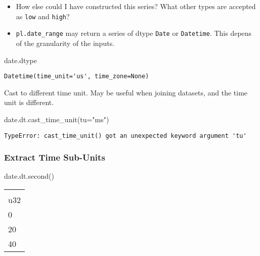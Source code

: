 \documentclass[
  letterpaper,
  DIV=11,
  numbers=noendperiod]{scrartcl}
\newenvironment{Shaded}{\begin{snugshade}}{\end{snugshade}}
\newcommand{\NormalTok}[1]{\textcolor[rgb]{0.00,0.23,0.31}{#1}}
\newcommand{\OperatorTok}[1]{\textcolor[rgb]{0.37,0.37,0.37}{#1}}
\newcommand{\StringTok}[1]{\textcolor[rgb]{0.13,0.47,0.30}{#1}}
\providecommand{\tightlist}{%
  \setlength{\itemsep}{0pt}\setlength{\parskip}{0pt}}\usepackage{longtable,booktabs,array}
\begin{document}
\begin{itemize}
\tightlist
\item
  How else could I have constructed this series? What other types are
  accepted as \texttt{low} and \texttt{high}?
\item
  \texttt{pl.date\_range} may return a series of dtype \texttt{Date} or
  \texttt{Datetime}. This depens of the granularity of the inputs.
\end{itemize}

\begin{Shaded}
\begin{Highlighting}[]
\NormalTok{date.dtype}
\end{Highlighting}
\end{Shaded}

\begin{verbatim}
Datetime(time_unit='us', time_zone=None)
\end{verbatim}

Cast to different time unit. May be useful when joining datasets, and
the time unit is different.

\begin{Shaded}
\begin{Highlighting}[]
\NormalTok{date.dt.cast\_time\_unit(tu}\OperatorTok{=}\StringTok{"ms"}\NormalTok{)}
\end{Highlighting}
\end{Shaded}

\begin{verbatim}
TypeError: cast_time_unit() got an unexpected keyword argument 'tu'
\end{verbatim}

\hypertarget{extract-time-sub-units}{%
\subsubsection{Extract Time Sub-Units}\label{extract-time-sub-units}}

\begin{Shaded}
\begin{Highlighting}[]
\NormalTok{date.dt.second()}
\end{Highlighting}
\end{Shaded}

\begin{longtable}[]{@{}l@{}}
\toprule()
 \\
u32 \\
\midrule()
\endhead
0 \\
20 \\
40 \\
\bottomrule()
\end{longtable}
\end{document}
